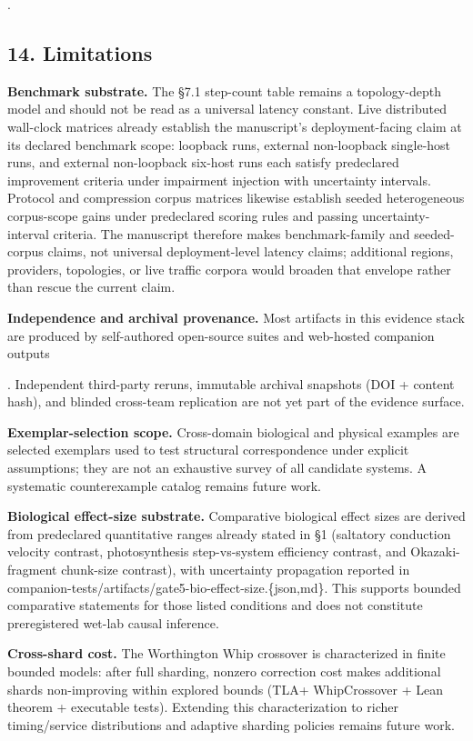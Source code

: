 \documentclass[
]{article}
\begin{document}
.

\subsection{\texorpdfstring{\textbf{14.
Limitations}}{14. Limitations}}\label{limitations}

\textbf{Benchmark substrate.} The §7.1 step-count table remains a
topology-depth model and should not be read as a universal latency
constant. Live distributed wall-clock matrices already establish the
manuscript's deployment-facing claim at its declared benchmark scope:
loopback runs, external non-loopback single-host runs, and external
non-loopback six-host runs each satisfy predeclared improvement criteria
under impairment injection with uncertainty intervals. Protocol and
compression corpus matrices likewise establish seeded heterogeneous
corpus-scope gains under predeclared scoring rules and passing
uncertainty-interval criteria. The manuscript therefore makes
benchmark-family and seeded-corpus claims, not universal
deployment-level latency claims; additional regions, providers,
topologies, or live traffic corpora would broaden that envelope rather
than rescue the current claim.

\textbf{Independence and archival provenance.} Most artifacts in this
evidence stack are produced by self-authored open-source suites and
web-hosted companion outputs

. Independent third-party reruns, immutable archival snapshots (DOI +
content hash), and blinded cross-team replication are not yet part of
the evidence surface.

\textbf{Exemplar-selection scope.} Cross-domain biological and physical
examples are selected exemplars used to test structural correspondence
under explicit assumptions; they are not an exhaustive survey of all
candidate systems. A systematic counterexample catalog remains future
work.

\textbf{Biological effect-size substrate.} Comparative biological effect
sizes are derived from predeclared quantitative ranges already stated in
§1 (saltatory conduction velocity contrast, photosynthesis
step-vs-system efficiency contrast, and Okazaki-fragment chunk-size
contrast), with uncertainty propagation reported in
companion-tests/artifacts/gate5-bio-effect-size.\{json,md\}. This
supports bounded comparative statements for those listed conditions and
does not constitute preregistered wet-lab causal inference.

\textbf{Cross-shard cost.} The Worthington Whip crossover is
characterized in finite bounded models: after full sharding, nonzero
correction cost makes additional shards non-improving within explored
bounds (TLA+ WhipCrossover + Lean theorem + executable tests). Extending
this characterization to richer timing/service distributions and
adaptive sharding policies remains future work.
\end{document}
